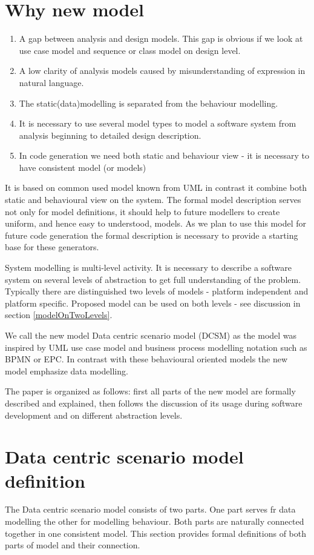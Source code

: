 \documentclass[10pt,a4paper]{article}
\begin{document}
\section{Why new model}
\begin{enumerate}
\item A gap between analysis and design models. This gap is obvious if we look at use case model and sequence or class model on design level.
\item A low clarity of analysis models caused by misunderstanding of expression in natural language.
\item The static(data)modelling is separated from the behaviour modelling. 
\item It is necessary to use several model types to model a software system from analysis beginning to detailed design description. 
\item In code generation we need both static and behaviour view - it is necessary to have consistent model (or models)
\end{enumerate}

It is based on common used model known from UML in contrast it combine both static and behavioural view on the system. The formal model description serves not only for model definitions, it should help to future modellers to create uniform, and hence easy to understood, models. As we plan to use this model for future code generation the formal description is necessary to provide a starting base for these generators. 

System modelling is multi-level activity. It is necessary to describe a software system on several levels of abstraction to get full understanding of the problem. Typically there are distinguished two levels of models - platform independent and platform specific. Proposed model can be used on both levels - see discussion in section \ref{modelOnTwoLevels}. 

We call the new model Data centric scenario model (DCSM) as the model was inspired by UML use case model and business process modelling notation such as BPMN or EPC. In contrast with these behavioural oriented models the new model emphasize data modelling.

The paper is organized as follows: first all parts of the new model are formally described and explained, then follows the discussion of its usage during software development and on different abstraction levels.

\section{Data centric scenario model definition}
The Data centric scenario model consists of two parts. One part serves fr data modelling the other for modelling behaviour. Both parts are naturally connected together in one consistent model. This section provides formal definitions of both parts of model and their connection.
\end{document}
